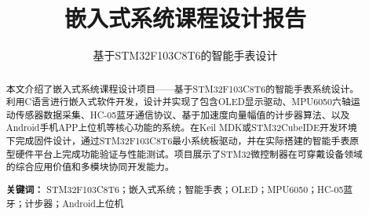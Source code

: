 \documentclass[12pt, a4paper]{ctexart}
\title{嵌入式系统课程设计报告}
\subtitle{基于STM32F103C8T6的智能手表设计}
\begin{document}
\makecover

\newpage
\begin{abstract}
本文介绍了嵌入式系统课程设计项目——基于STM32F103C8T6的智能手表系统设计。利用C语言进行嵌入式软件开发，设计并实现了包含OLED显示驱动、MPU6050六轴运动传感器数据采集、HC-05蓝牙通信协议、基于加速度向量幅值的计步器算法、以及Android手机APP上位机等核心功能的系统。在Keil MDK或STM32CubeIDE开发环境下完成固件设计，通过STM32F103C8T6最小系统板驱动，并在实际搭建的智能手表原型硬件平台上完成功能验证与性能测试。项目展示了STM32微控制器在可穿戴设备领域的综合应用价值和多模块协同开发能力。
\par
\textbf{关键词：} STM32F103C8T6；嵌入式系统；智能手表；OLED；MPU6050；HC-05蓝牙；计步器；Android上位机\end{abstract}
\clearpage

\tableofcontents
\clearpage

\setcounter{page}{1} %









\end{document}
